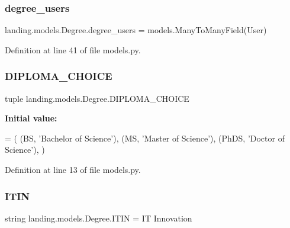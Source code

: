 \subsubsection{\texorpdfstring{degree\+\_\+users}{degree\_users}}
{\footnotesize\ttfamily landing.\+models.\+Degree.\+degree\+\_\+users = models.\+Many\+To\+Many\+Field(User)\hspace{0.3cm}{\ttfamily [static]}}



Definition at line 41 of file models.\+py.

\mbox{\label{classlanding_1_1models_1_1Degree_a7972b49cb5153c95f5a5d509de3b1135}} 
\subsubsection{\texorpdfstring{D\+I\+P\+L\+O\+M\+A\+\_\+\+C\+H\+O\+I\+CE}{DIPLOMA\_CHOICE}}
{\footnotesize\ttfamily tuple landing.\+models.\+Degree.\+D\+I\+P\+L\+O\+M\+A\+\_\+\+C\+H\+O\+I\+CE\hspace{0.3cm}{\ttfamily [static]}}

{\bfseries Initial value\+:}
\begin{DoxyCode}
=  (
        (BS, \textcolor{stringliteral}{'Bachelor of Science'}),
        (MS, \textcolor{stringliteral}{'Master of Science'}),
        (PhDS, \textcolor{stringliteral}{'Doctor of Science'}),
    )
\end{DoxyCode}


Definition at line 13 of file models.\+py.

\mbox{\label{classlanding_1_1models_1_1Degree_a0d92d2c83362111ad3cf7ee19d107897}} 
\subsubsection{\texorpdfstring{I\+T\+IN}{ITIN}}
{\footnotesize\ttfamily string landing.\+models.\+Degree.\+I\+T\+IN = \textquotesingle{}IT Innovation\textquotesingle{}\hspace{0.3cm}{\ttfamily [static]}}



